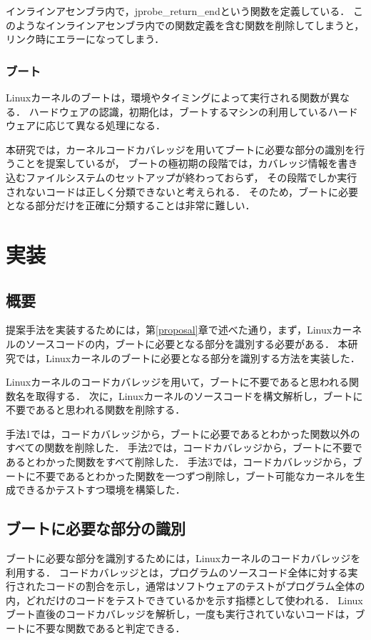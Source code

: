 \documentclass[graduation-thesis]{mlarticle}
\begin{document}
インラインアセンブラ内で，jprobe\_return\_endという関数を定義している．
このようなインラインアセンブラ内での関数定義を含む関数を削除してしまうと，リンク時にエラーになってしまう．


\subsubsection{ブート}
\label{propo:linux:boot}

Linuxカーネルのブートは，環境やタイミングによって実行される関数が異なる．
ハードウェアの認識，初期化は，ブートするマシンの利用しているハードウェアに応じて異なる処理になる．

本研究では，カーネルコードカバレッジを用いてブートに必要な部分の識別を行うことを提案しているが，
ブートの極初期の段階では，カバレッジ情報を書き込むファイルシステムのセットアップが終わっておらず，
その段階でしか実行されないコードは正しく分類できないと考えられる．
そのため，ブートに必要となる部分だけを正確に分類することは非常に難しい．


\clearpage
\section{実装}
\label{implementation}
\subsection{概要}
\label{implementation:abstruction}
提案手法を実装するためには，第\ref{proposal}章で述べた通り，まず，Linuxカーネルのソースコードの内，ブートに必要となる部分を識別する必要がある．
本研究では，Linuxカーネルのブートに必要となる部分を識別する方法を実装した．

Linuxカーネルのコードカバレッジを用いて，ブートに不要であると思われる関数名を取得する．
次に，Linuxカーネルのソースコードを構文解析し，ブートに不要であると思われる関数を削除する．

手法1では，コードカバレッジから，ブートに必要であるとわかった関数以外のすべての関数を削除した．
手法2では，コードカバレッジから，ブートに不要であるとわかった関数をすべて削除した．
手法3では，コードカバレッジから，ブートに不要であるとわかった関数を一つずつ削除し，ブート可能なカーネルを生成できるかテストすつ環境を構築した．


\subsection{ブートに必要な部分の識別}
\label{implementation:boot}
ブートに必要な部分を識別するためには，Linuxカーネルのコードカバレッジを利用する．
コードカバレッジとは，プログラムのソースコード全体に対する実行されたコードの割合を示し，通常はソフトウェアのテストがプログラム全体の内，どれだけのコードをテストできているかを示す指標として使われる．
Linuxブート直後のコードカバレッジを解析し，一度も実行されていないコードは，ブートに不要な関数であると判定できる．
\end{document}

